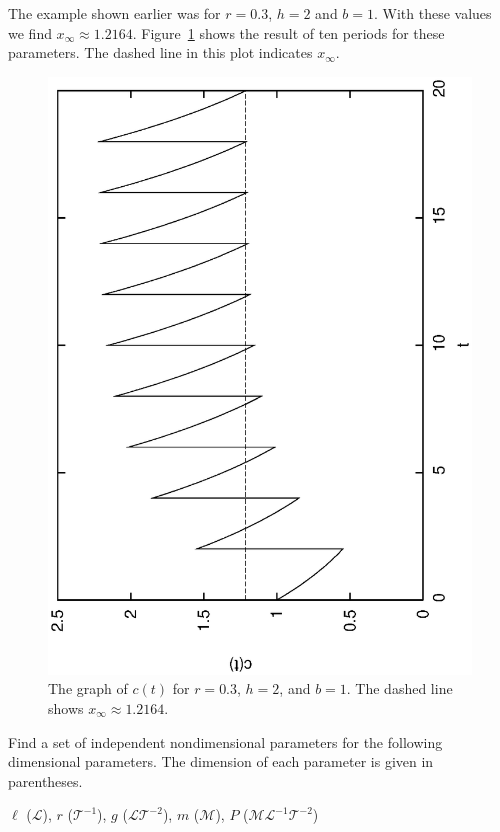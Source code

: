 The example shown earlier was for $r=0.3$, $h=2$ and $b=1$.
With these values we find $x_{\infty} \approx 1.2164$.
Figure~\ref{fig:PeriodicDrugDosePlotWithXinf}
shows the result of ten periods for these parameters.
The dashed line in this plot indicates $x_{\infty}$.
\begin{figure}
\centerline{%
\includegraphics[angle=270,width=4.5in]{python_PeriodicDrugDose/PeriodicDrugDosePlotWithXinf.eps}
}
\caption{The graph of $c(t)$ for $r=0.3$, $h=2$, and $b=1$.
The dashed line shows $x_{\infty} \approx 1.2164$.}
\label{fig:PeriodicDrugDosePlotWithXinf}
\end{figure}
%

\newpage

\begin{exercises}
\begin{exercise}
\label{ex:Nondim_lrgmP}
Find a set of independent nondimensional parameters for the following
dimensional parameters.  The dimension of each parameter
is given in parentheses.

\centerline{$\ell$ ($\mathcal{L}$), $r$ ($\mathcal{T}^{-1}$),
$g$ ($\mathcal{LT}^{-2}$), $m$ ($\mathcal{M}$),
$P$ ($\mathcal{M}\mathcal{L}^{-1}\mathcal{T}^{-2}$)}
\end{exercise}
\end{exercises}

